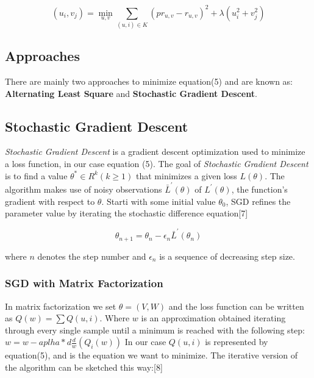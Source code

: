 \documentclass{sig-alternate-05-2015}
\begin{document}
\begin{equation}
    {(u_{i},v_{j}) = \min_{u,v} {\sum\limits_{(u,i) \in K} {(pr_{u,v} - r_{u,v})}^{2} + \lambda(u_{i}^{2} + v_{j}^{2}) }}
\end{equation}


\subsection{Approaches}
There are mainly two approaches to minimize equation(5) and are known as:\\
\textbf{Alternating Least Square} and \textbf{Stochastic Gradient Descent}.

\subsection{Stochastic Gradient Descent}

\textit{Stochastic Gradient Descent} is a gradient descent optimization used
to minimize a loss function, in our case equation (5).
The goal of \textit{Stochastic Gradient Descent} is to find a value
$\theta^{*} \in R^{k} (k \geq 1) $ that minimizes a given loss $L(\theta)$.
The algorithm makes use of noisy observations $\bar{L}^{\prime}(\theta)$
of $L^{\prime}(\theta)$, the function's gradient with respect to $\theta$.
Starti with some initial value $\theta_{0}$, SGD refines the parameter
value by iterating the stochastic difference equation[7]

\begin{equation}
    {\theta_{n+1} = \theta_{n} - \epsilon_{n} \bar{L}^{\prime}(\theta_{n})}
\end{equation}

where $n$ denotes the step number and $\epsilon_{n}$ is a sequence of
decreasing step size.

\subsubsection{SGD with Matrix Factorization}

In matrix factorization we set $\theta = (V,W)$ and the loss function
can be written as $ Q(w) = {\sum Q(u,i)}$. Where $w$ is an approximation
obtained iterating through every single sample until a minimum is reached with
the following step: $w= w - aplha * d{\frac dw}(Q_{i}(w)) $
In our case $Q(u,i)$ is represented by equation(5), and is the equation
we want to minimize.
The iterative version of the algorithm can be sketched this way:[8]\\
\end{document}
